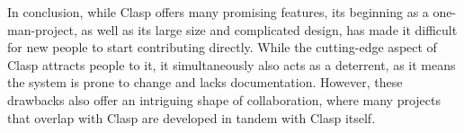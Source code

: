 In conclusion, while Clasp offers many promising features, its beginning as a one-man-project, as well as its large size and complicated design, has made it difficult for new people to start contributing directly. While the cutting-edge aspect of Clasp attracts people to it, it simultaneously also acts as a deterrent, as it means the system is prone to change and lacks documentation. However, these drawbacks also offer an intriguing shape of collaboration, where many projects that overlap with Clasp are developed in tandem with Clasp itself.

